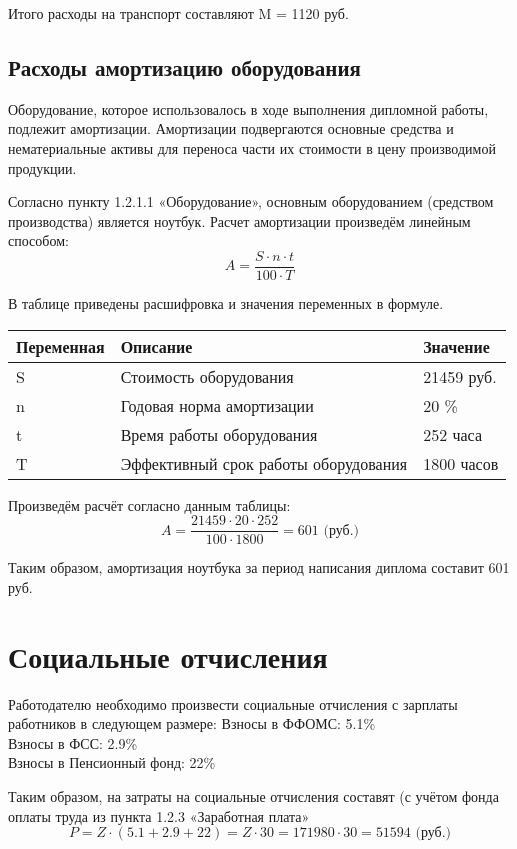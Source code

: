 Итого расходы на транспорт составляют M = 1120 руб.

\subsection{Расходы амортизацию оборудования}

Оборудование, которое использовалось в ходе выполнения дипломной ра\-боты, подлежит амортизации. Амортизации подвергаются основные средства и нематериальные активы для переноса части их стоимости в цену производи\-мой продукции.

Согласно пункту 1.2.1.1 «Оборудование», основным оборудованием (сред\-ством производства) является ноутбук. Расчет амортизации произведём ли\-нейным способом:
$$
A = \frac{S\cdot n \cdot t}{ 100 \cdot T}
$$

В таблице приведены расшифровка и значения переменных в формуле.
\begin{table}[H]
\begin{center}
\begin{tabular}{|p{3.0cm}|p{3.8cm}|p{2.6cm}|}
\hline
Переменная&
Описание&
Значение\\
\hline
S&
Стоимость оборудования&
21459 руб.\\
\hline
n&
Годовая норма амортизации&
20 \%\\
\hline
t&
Время работы оборудования&
252 часа\\
\hline
T&
Эффективный срок работы оборудования&
1800 часов\\
\hline
\end{tabular}
\end{center}
\end{table}

Произведём расчёт согласно данным таблицы:
$$
A = \frac{21459\cdot 20 \cdot 252}{ 100 \cdot 1800} = 601 \mbox{ (руб.)}
$$

Таким образом, амортизация ноутбука за период написания диплома со\-ставит 601 руб.

\section{Социальные отчисления}

Работодателю необходимо произвести социальные отчисления с зарплаты работников в следующем размере:
Взносы в ФФОМС: 5.1\%\\
Взносы в ФСС: 2.9\%\\
Взносы в Пенсионный фонд: 22\%

Таким образом, на затраты на социальные отчисления составят (с учётом фонда оплаты труда из пункта 1.2.3 «Заработная плата»
$$
P = Z \cdot (5.1 + 2.9 + 22) = Z \cdot 30 = 171980 \cdot 30 = 51594 \mbox{ (руб.)}
$$

